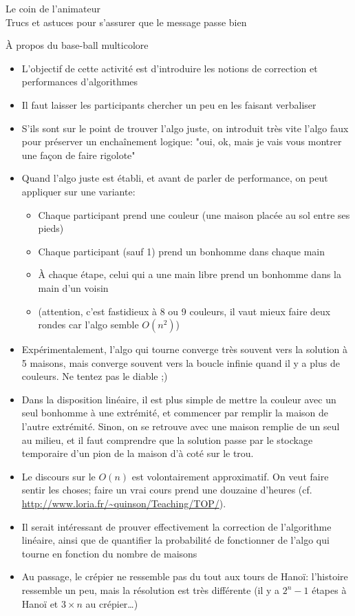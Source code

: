 \documentclass[final,hyperref={pdfpagelabels=false}]{beamer}
\renewcommand*{\large}{\fontsize{\resultlargeX}{\resultlargeY}\selectfont}
\begin{document}
\begin{frame}{Le coin de l'animateur\\[-5pt]
  {\large Trucs et astuces pour s'assurer que le message passe bien}}
  \begin{block}{À propos du base-ball multicolore}
    \begin{itemize}
    \item L'objectif de cette activité est d'introduire les notions de
      correction et performances d'algorithmes
    \item Il faut laisser les participants chercher un peu en les faisant verbaliser
    \item S'ils sont sur le point de trouver l'algo juste, on introduit très
      vite l'algo faux pour préserver un enchaînement logique: "oui, ok, mais
      je vais vous montrer une façon de faire rigolote"
    \item Quand l'algo juste est établi, et avant de parler de performance, on
      peut appliquer sur une variante:\vspace{-\baselineskip}
      \begin{itemize}
      \item Chaque participant prend une couleur (une maison placée au sol entre ses pieds)
      \item Chaque participant (sauf 1) prend un bonhomme dans chaque main
      \item À chaque étape, celui qui a une main libre prend un bonhomme dans la main d'un voisin
      \item (attention, c'est fastidieux à 8 ou 9 couleurs, il vaut mieux faire
        deux rondes car l'algo semble $O(n^2)$)
      \end{itemize}
    \item Expérimentalement, l'algo qui tourne converge très souvent vers la
      solution à 5 maisons, mais converge souvent vers la boucle infinie quand
      il y a plus de couleurs. Ne tentez pas le diable ;)
    \item Dans la disposition linéaire, il est plus simple de mettre la couleur
      avec un seul bonhomme à une extrémité, et commencer par remplir la maison
      de l'autre extrémité. Sinon, on se retrouve avec une maison remplie de un
      seul au milieu, et il faut comprendre que la solution passe par le
      stockage temporaire d'un pion de la maison d'à coté sur le trou.
    \item Le discours sur le $O(n)$ est volontairement approximatif. On veut
      faire sentir les choses; faire un vrai cours prend une douzaine d'heures
      (cf. \url{http://www.loria.fr/~quinson/Teaching/TOP/}).
    \item Il serait intéressant de prouver effectivement la correction de
      l'algorithme linéaire, ainsi que de quantifier la probabilité de
      fonctionner de l'algo qui tourne en fonction du nombre de maisons
    \item Au passage, le crépier ne ressemble pas du tout aux tours de Hanoï:
      l'histoire ressemble un peu, mais la résolution est très différente (il y
      a $2^n-1$ étapes à Hanoï et $3\times n$ au crépier\ldots)
    \end{itemize}
  \end{block}
\end{frame}
\end{document}

